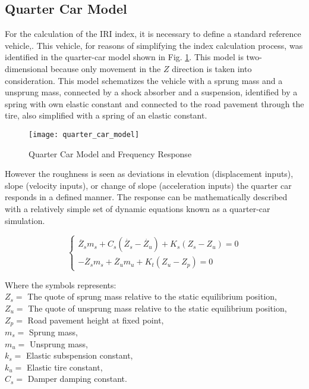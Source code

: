 \documentclass[tesi]{subfiles}
\begin{document}
\subsection{Quarter Car Model}\label{ssc:Quarter Car Model}
For the calculation of the IRI index, it is necessary to define a standard reference vehicle,\cite{little_book}. This vehicle, for reasons of simplifying the index calculation process, was identified in the quarter-car model shown in Fig. \ref{fig:Quarter Car Model}. This model is two-dimensional because only
movement in the $Z$ direction is taken into consideration. This model schematizes the vehicle with a sprung mass and a unsprung mass, connected by a shock absorber and a suspension, identified by a spring with own elastic constant and connected to the road pavement through the tire, also simplified with a spring of an elastic constant\cite{little_book}.

\begin{figure}[ht]
\centering
\texttt{[image: quarter\_car\_model]}
\caption{Quarter Car Model and Frequency Response}

\label{fig:Quarter Car Model}
\end{figure}



 \noindent \cite{gillespie1992everything}However the roughness is seen as deviations in elevation (displacement inputs), slope (velocity inputs), or change of slope (acceleration inputs) the quarter car responds in a defined manner. The response can be mathematically described with a relatively simple set
of dynamic equations known as a quarter-car simulation.


\begin{center}

\[
    \left\{
                \begin{array}{ll}
                  \ddot{Z_{s}} m_{s} + C_{s} ( \dot{Z_{s}} - \dot{Z_{u}} ) + K_{s} (Z_{s} - Z_{u}) = 0\\
                  - \ddot{Z_{s}} m_{s} + \ddot{Z_{u}} m_{u} + K_{t} ( Z_{u} - Z_{p} ) = 0
                \end{array}
              \right.
\]




\end{center}

\noindent Where the symbols represents:
\\
$ Z_{s} =  $ The quote of sprung mass relative to the static equilibrium position,	\\
$ Z_{u} =  $ The quote of unsprung mass relative to the static equilibrium position,\\
$ Z_{p} = $ Road pavement height at fixed point,\\
$ m_{s} = $ Sprung mass,	\\
$ m_{u} = $ Unsprung mass, \\
$ k_{s} = $ Elastic subspension constant, \\
$ k_{u} = $ Elastic tire constant, \\
$C_{s} = $ Damper damping constant.\\
\end{document}
